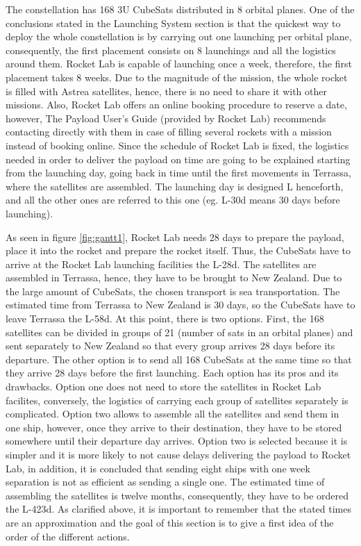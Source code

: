The constellation has 168 3U CubeSats distributed in 8 orbital planes. One of the conclusions stated in the Launching System section  is that the quickest way to deploy the whole constellation is by carrying out one launching per orbital plane, consequently, the first placement consists on 8 launchings and all the logistics around them. Rocket Lab is capable of launching once a week, therefore, the first placement takes 8 weeks. Due to the magnitude of the mission, the whole rocket is filled with Astrea satellites, hence, there is no need to share it with other missions. Also, Rocket Lab offers an online booking procedure to reserve a date, however, The Payload User's Guide (provided by Rocket Lab) recommends contacting directly with them in case of filling several rockets with a mission instead of booking online.  
\newline
Since the schedule of Rocket Lab is fixed, the logistics needed in order to deliver the payload on time are going to be explained starting from the launching day, going back in time until the first movements in Terrassa, where the satellites are assembled. 
The launching day is designed L henceforth, and all the other ones are referred to this one (eg. L-30d means 30 days before launching). 


As seen in figure \ref{fig:gantt1}, Rocket Lab needs 28 days to prepare the payload, place it into the rocket and prepare the rocket itself. Thus, the CubeSats have to arrive at the Rocket Lab launching facilities the L-28d. The satellites are assembled in Terrassa, hence, they have to be brought to New Zealand. Due to the large amount of CubeSats, the chosen transport is sea transportation. The estimated time from Terrassa to New Zealand is 30 days, so the CubeSats have to leave Terrassa the L-58d. At this point, there is two options. First, the 168 satellites can be divided in groups of 21 (number of sats in an orbital planes) and sent separately to New Zealand so that every group arrives 28 days before its departure. The other option is to send all 168 CubeSats at the same time so that they arrive 28 days before the first launching. Each option has its pros and its drawbacks. Option one does not need to store the satellites in Rocket Lab facilites, conversely, the logistics of carrying each group of satellites separately is complicated. Option two allows to assemble all the satellites and send them in one ship, however, once they arrive to their destination, they have to be stored somewhere until their departure day arrives. Option two is selected because it is simpler and it is more likely to not cause delays delivering the payload to Rocket Lab, in addition, it is concluded that sending eight ships with one week separation is not as efficient as sending a single one. 
\newline
The estimated time of assembling the satellites is twelve months, consequently, they have to be ordered the L-423d. 
\newline
As clarified above, it is important to remember that the stated times are an approximation and the goal of this section is to give a first idea of the order of the different actions. 
